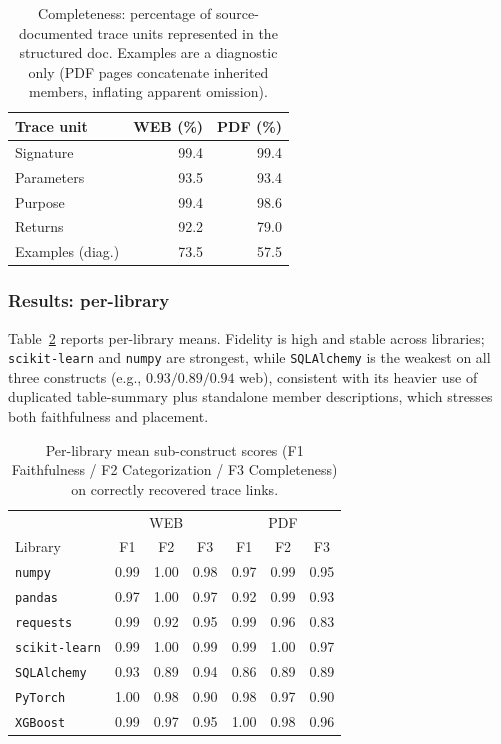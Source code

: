 \begin{table}[t]
\centering
\caption{Completeness: percentage of source-documented trace units represented
in the structured doc. Examples are a diagnostic only (PDF pages concatenate
inherited members, inflating apparent omission).}
\label{tab:fidelity-completeness}
\begin{tabular}{lrr}
\toprule
Trace unit & WEB (\%) & PDF (\%) \\
\midrule
Signature        & 99.4 & 99.4 \\
Parameters       & 93.5 & 93.4 \\
Purpose          & 99.4 & 98.6 \\
Returns          & 92.2 & 79.0 \\
\midrule
Examples (diag.) & 73.5 & 57.5 \\
\bottomrule
\end{tabular}
\end{table}

\subsubsection{Results: per-library}
Table~\ref{tab:fidelity-perlib} reports per-library means. Fidelity is high and
stable across libraries; \texttt{scikit-learn} and \texttt{numpy} are strongest,
while \texttt{SQLAlchemy} is the weakest on all three constructs (e.g.,
$0.93/0.89/0.94$ web), consistent with its heavier use of duplicated
table-summary plus standalone member descriptions, which stresses both
faithfulness and placement.

\begin{table}[t]
\centering
\caption{Per-library mean sub-construct scores (F1 Faithfulness / F2
Categorization / F3 Completeness) on correctly recovered trace links.}
\label{tab:fidelity-perlib}
\begin{tabular}{lccc|ccc}
\toprule
& \multicolumn{3}{c|}{WEB} & \multicolumn{3}{c}{PDF} \\
Library & F1 & F2 & F3 & F1 & F2 & F3 \\
\midrule
\texttt{numpy}        & 0.99 & 1.00 & 0.98 & 0.97 & 0.99 & 0.95 \\
\texttt{pandas}       & 0.97 & 1.00 & 0.97 & 0.92 & 0.99 & 0.93 \\
\texttt{requests}     & 0.99 & 0.92 & 0.95 & 0.99 & 0.96 & 0.83 \\
\texttt{scikit-learn} & 0.99 & 1.00 & 0.99 & 0.99 & 1.00 & 0.97 \\
\texttt{SQLAlchemy}   & 0.93 & 0.89 & 0.94 & 0.86 & 0.89 & 0.89 \\
\texttt{PyTorch}      & 1.00 & 0.98 & 0.90 & 0.98 & 0.97 & 0.90 \\
\texttt{XGBoost}      & 0.99 & 0.97 & 0.95 & 1.00 & 0.98 & 0.96 \\
\bottomrule
\end{tabular}
\end{table}

